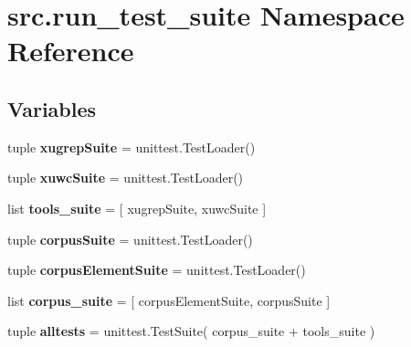 \hypertarget{namespacesrc_1_1run__test__suite}{\section{src.\-run\-\_\-test\-\_\-suite Namespace Reference}
\label{namespacesrc_1_1run__test__suite}
}
\subsection*{Variables}
\begin{DoxyCompactItemize}
\item 
\hypertarget{namespacesrc_1_1run__test__suite_acb55a3555fa26fee6715c9020a76d981}{tuple {\bfseries xugrep\-Suite} = unittest.\-Test\-Loader()}\label{namespacesrc_1_1run__test__suite_acb55a3555fa26fee6715c9020a76d981}

\item 
\hypertarget{namespacesrc_1_1run__test__suite_a62dd731bb2ec6bf27a806e0de54cd35c}{tuple {\bfseries xuwc\-Suite} = unittest.\-Test\-Loader()}\label{namespacesrc_1_1run__test__suite_a62dd731bb2ec6bf27a806e0de54cd35c}

\item 
\hypertarget{namespacesrc_1_1run__test__suite_a7992c9443edf3a10e41b2ac3aa2c98c3}{list {\bfseries tools\-\_\-suite} = \mbox{[} xugrep\-Suite, xuwc\-Suite \mbox{]}}\label{namespacesrc_1_1run__test__suite_a7992c9443edf3a10e41b2ac3aa2c98c3}

\item 
\hypertarget{namespacesrc_1_1run__test__suite_aae0e41392556af025146fc670432b924}{tuple {\bfseries corpus\-Suite} = unittest.\-Test\-Loader()}\label{namespacesrc_1_1run__test__suite_aae0e41392556af025146fc670432b924}

\item 
\hypertarget{namespacesrc_1_1run__test__suite_ae2f9f83903d172f9821e7259cdeb2f61}{tuple {\bfseries corpus\-Element\-Suite} = unittest.\-Test\-Loader()}\label{namespacesrc_1_1run__test__suite_ae2f9f83903d172f9821e7259cdeb2f61}

\item 
\hypertarget{namespacesrc_1_1run__test__suite_aab0a610a4c71796d13152bb23a21adb6}{list {\bfseries corpus\-\_\-suite} = \mbox{[} corpus\-Element\-Suite, corpus\-Suite \mbox{]}}\label{namespacesrc_1_1run__test__suite_aab0a610a4c71796d13152bb23a21adb6}

\item 
\hypertarget{namespacesrc_1_1run__test__suite_a0347e3c57d4a0e2088db095eaefafc32}{tuple {\bfseries alltests} = unittest.\-Test\-Suite( corpus\-\_\-suite + tools\-\_\-suite )}\label{namespacesrc_1_1run__test__suite_a0347e3c57d4a0e2088db095eaefafc32}

\end{DoxyCompactItemize}


